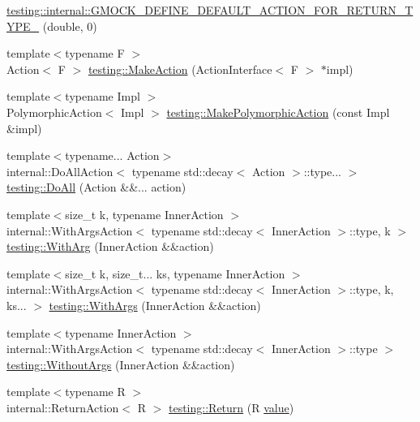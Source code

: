 \begin{DoxyCompactItemize}
\mbox{\hyperlink{namespacetesting_1_1internal_a7ba92aa33f4968c902623cd02e445020}{testing\+::internal\+::\+G\+M\+O\+C\+K\+\_\+\+D\+E\+F\+I\+N\+E\+\_\+\+D\+E\+F\+A\+U\+L\+T\+\_\+\+A\+C\+T\+I\+O\+N\+\_\+\+F\+O\+R\+\_\+\+R\+E\+T\+U\+R\+N\+\_\+\+T\+Y\+P\+E\+\_\+}} (double, 0)
\item 
{\footnotesize template$<$typename F $>$ }\\Action$<$ F $>$ \mbox{\hyperlink{namespacetesting_aa254d28c8d883899cbf11ea2f05fc195}{testing\+::\+Make\+Action}} (Action\+Interface$<$ F $>$ $\ast$impl)
\item 
{\footnotesize template$<$typename Impl $>$ }\\Polymorphic\+Action$<$ Impl $>$ \mbox{\hyperlink{namespacetesting_a45df529b8166936d970884383f0ede82}{testing\+::\+Make\+Polymorphic\+Action}} (const Impl \&impl)
\item 
{\footnotesize template$<$typename... Action$>$ }\\internal\+::\+Do\+All\+Action$<$ typename std\+::decay$<$ Action $>$\+::type... $>$ \mbox{\hyperlink{namespacetesting_a3824c79dc6e9e05c337a675e82da2045}{testing\+::\+Do\+All}} (Action \&\&... action)
\item 
{\footnotesize template$<$size\+\_\+t k, typename Inner\+Action $>$ }\\internal\+::\+With\+Args\+Action$<$ typename std\+::decay$<$ Inner\+Action $>$\+::type, k $>$ \mbox{\hyperlink{namespacetesting_ab27beef02a13e44e0448b9c50e763e0b}{testing\+::\+With\+Arg}} (Inner\+Action \&\&action)
\item 
{\footnotesize template$<$size\+\_\+t k, size\+\_\+t... ks, typename Inner\+Action $>$ }\\internal\+::\+With\+Args\+Action$<$ typename std\+::decay$<$ Inner\+Action $>$\+::type, k, ks... $>$ \mbox{\hyperlink{namespacetesting_a4b8dc8233e7b92226ffe51e0d0040604}{testing\+::\+With\+Args}} (Inner\+Action \&\&action)
\item 
{\footnotesize template$<$typename Inner\+Action $>$ }\\internal\+::\+With\+Args\+Action$<$ typename std\+::decay$<$ Inner\+Action $>$\+::type $>$ \mbox{\hyperlink{namespacetesting_a0e5b756e6cf3ebf3abfdc1c913eb6376}{testing\+::\+Without\+Args}} (Inner\+Action \&\&action)
\item 
{\footnotesize template$<$typename R $>$ }\\internal\+::\+Return\+Action$<$ R $>$ \mbox{\hyperlink{namespacetesting_adae3994eb444d1ad2dd602454b854663}{testing\+::\+Return}} (R \mbox{\hyperlink{_obj__test_2lib_2googletest-master_2googlemock_2test_2gmock-matchers__test_8cc_a337b8a670efc0b086ad3af163f3121b6}{value}})

\end{DoxyCompactItemize}
